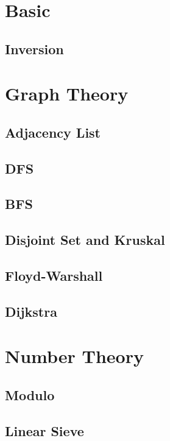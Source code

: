 \section{Basic}
        \subsection{Inversion}
            

\section{Graph Theory}
    \subsection{Adjacency List}
            
    \subsection{DFS}
        
    \subsection{BFS}
        
    \subsection{Disjoint Set and Kruskal}
        
    \subsection{Floyd-Warshall}
        
    \subsection{Dijkstra}
        

\section{Number Theory}
    \subsection{Modulo}
        
    \subsection{Linear Sieve}
        
